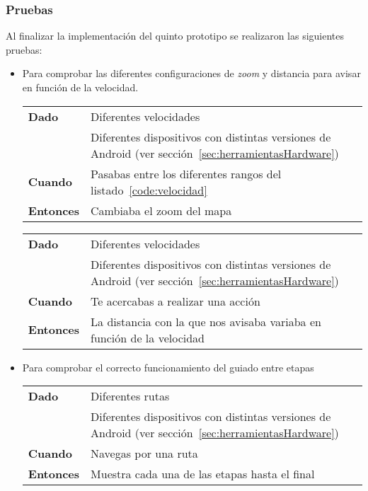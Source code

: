 \subsubsection{Pruebas}

Al finalizar la implementación del quinto prototipo se realizaron las siguientes pruebas:

\begin{itemize}
  \item Para comprobar las diferentes configuraciones de \emph{zoom} y distancia para avisar en
    función de la velocidad.

  \begin{tabular}{p{}p{}}
    \hline
    \textbf{Dado}     & Diferentes velocidades \\
                      & Diferentes dispositivos con distintas versiones de Android (ver
                        sección~\ref{sec:herramientasHardware}) \\
    \textbf{Cuando}   & Pasabas entre los diferentes rangos del listado~\ref{code:velocidad}\\
    \textbf{Entonces} & Cambiaba el zoom del mapa \\
    \hline
  \end{tabular}

  \begin{tabular}{p{}p{}}
    \hline
    \textbf{Dado}     & Diferentes velocidades \\
                      & Diferentes dispositivos con distintas versiones de Android (ver
                        sección~\ref{sec:herramientasHardware}) \\
    \textbf{Cuando}   & Te acercabas a realizar una acción \\
    \textbf{Entonces} & La distancia con la que nos avisaba variaba en función de la velocidad \\
    \hline
  \end{tabular}

  \item Para comprobar el correcto funcionamiento del guiado entre etapas

  \begin{tabular}{p{}p{}}
    \hline
    \textbf{Dado}     & Diferentes rutas \\
                      & Diferentes dispositivos con distintas versiones de Android (ver
                        sección~\ref{sec:herramientasHardware}) \\
    \textbf{Cuando}   & Navegas por una ruta \\
    \textbf{Entonces} & Muestra cada una de las etapas hasta el final \\
    \hline
  \end{tabular}


\end{itemize}
